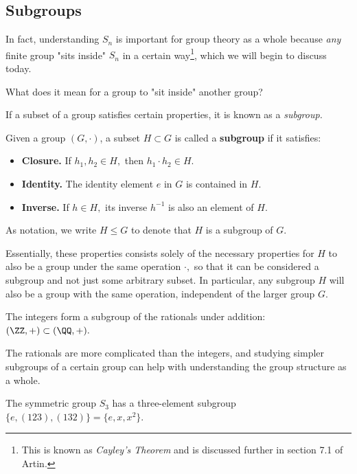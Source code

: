 \subsection{Subgroups}
In fact, understanding $S_n$ is important for group theory as a whole because \emph{any} finite group "sits inside" $S_n$ in a certain way\footnote{This is known as \emph{Cayley's Theorem} and is discussed further in section 7.1 of Artin.}, which we will begin to discuss today.
\begin{qq}
What does it mean for a group to "sit inside" another group?
\end{qq}

If a subset of a group satisfies certain properties, it is known as a \emph{subgroup.}
\begin{definition}
Given a group $(G, \cdot)$, a subset $H \subset G$ is called a \textbf{subgroup} if it satisfies:
\begin{itemize}
    \item \textbf{Closure.} If $h_1, h_2 \in H,$ then $h_1 \cdot h_2 \in H.$
    \item \textbf{Identity.} The identity element $e$ in $G$ is contained in $H.$
    \item \textbf{Inverse.} If $h \in H,$ its inverse $h^{-1}$ is also an element of $H.$
\end{itemize}

As notation, we write $H \leq G$ to denote that $H$ is a subgroup of $G.$
\end{definition}

Essentially, these properties consists solely of the necessary properties for $H$ to also be a group under the same operation $\cdot,$ so that it can be considered a subgroup and not just some arbitrary subset. In particular, any subgroup $H$ will also be a group with the same operation, independent of the larger group $G.$

\begin{example}
The integers form a subgroup of the rationals under addition: $(\ZZ, +) \subset (\QQ, +).$
\end{example}
The rationals are more complicated than the integers, and studying simpler subgroups of a certain group can help with understanding the group structure as a whole.

\begin{example}
The symmetric group $S_3$ has a three-element subgroup $\{e, (123), (132)\} = \{e, x, x^2\}.$
\end{example}

